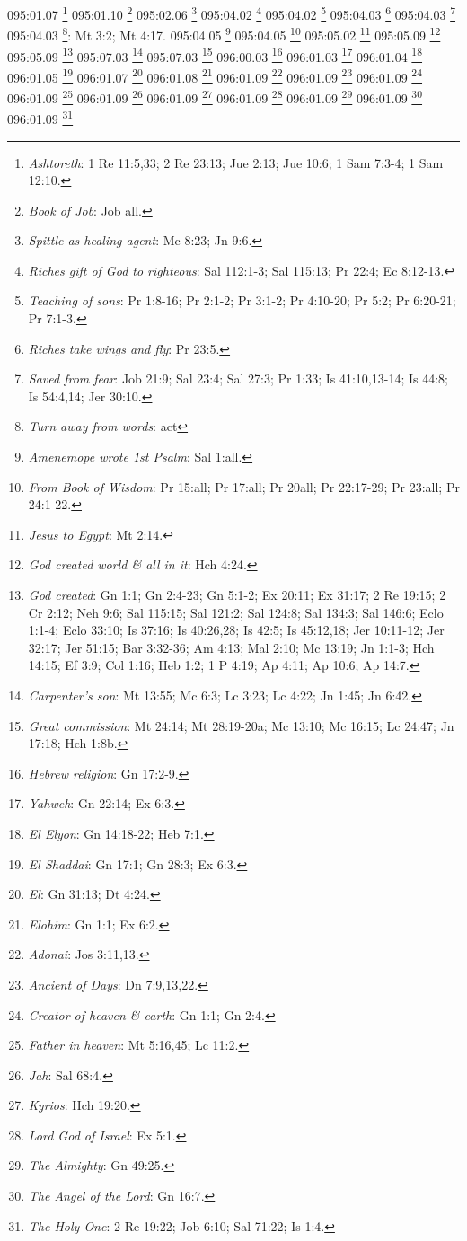 {{{{{{{{{{{{{{{{095:01.07 \footnote{\textit{Ashtoreth}: 1 Re 11:5,33; 2 Re 23:13; Jue 2:13; Jue 10:6; 1 Sam 7:3-4; 1 Sam 12:10.}
095:01.10 \footnote{\textit{Book of Job}: Job all.}
095:02.06 \footnote{\textit{Spittle as healing agent}: Mc 8:23; Jn 9:6.}
095:04.02 \footnote{\textit{Riches gift of God to righteous}: Sal 112:1-3; Sal 115:13; Pr 22:4; Ec 8:12-13.}
095:04.02 \footnote{\textit{Teaching of sons}: Pr 1:8-16; Pr 2:1-2; Pr 3:1-2; Pr 4:10-20; Pr 5:2; Pr 6:20-21; Pr 7:1-3.}
095:04.03 \footnote{\textit{Riches take wings and fly}: Pr 23:5.}
095:04.03 \footnote{\textit{Saved from fear}: Job 21:9; Sal 23:4; Sal 27:3; Pr 1:33; Is 41:10,13-14; Is 44:8; Is 54:4,14; Jer 30:10.}
095:04.03 \footnote{\textit{Turn away from words}: act}: Mt 3:2; Mt 4:17.}
095:04.05 \footnote{\textit{Amenemope wrote 1st Psalm}: Sal 1:all.}
095:04.05 \footnote{\textit{From Book of Wisdom}: Pr 15:all; Pr 17:all; Pr 20all; Pr 22:17-29; Pr 23:all; Pr 24:1-22.}
095:05.02 \footnote{\textit{Jesus to Egypt}: Mt 2:14.}
095:05.09 \footnote{\textit{God created world & all in it}: Hch 4:24.}
095:05.09 \footnote{\textit{God created}: Gn 1:1; Gn 2:4-23; Gn 5:1-2; Ex 20:11; Ex 31:17; 2 Re 19:15; 2 Cr 2:12; Neh 9:6; Sal 115:15; Sal 121:2; Sal 124:8; Sal 134:3; Sal 146:6; Eclo 1:1-4; Eclo 33:10; Is 37:16; Is 40:26,28; Is 42:5; Is 45:12,18; Jer 10:11-12; Jer 32:17; Jer 51:15; Bar 3:32-36; Am 4:13; Mal 2:10; Mc 13:19; Jn 1:1-3; Hch 14:15; Ef 3:9; Col 1:16; Heb 1:2; 1 P 4:19; Ap 4:11; Ap 10:6; Ap 14:7.}
095:07.03 \footnote{\textit{Carpenter's son}: Mt 13:55; Mc 6:3; Lc 3:23; Lc 4:22; Jn 1:45; Jn 6:42.}
095:07.03 \footnote{\textit{Great commission}: Mt 24:14; Mt 28:19-20a; Mc 13:10; Mc 16:15; Lc 24:47; Jn 17:18; Hch 1:8b.}
096:00.03 \footnote{\textit{Hebrew religion}: Gn 17:2-9.}
096:01.03 \footnote{\textit{Yahweh}: Gn 22:14; Ex 6:3.}
096:01.04 \footnote{\textit{El Elyon}: Gn 14:18-22; Heb 7:1.}
096:01.05 \footnote{\textit{El Shaddai}: Gn 17:1; Gn 28:3; Ex 6:3.}
096:01.07 \footnote{\textit{El}: Gn 31:13; Dt 4:24.}
096:01.08 \footnote{\textit{Elohim}: Gn 1:1; Ex 6:2.}
096:01.09 \footnote{\textit{Adonai}: Jos 3:11,13.}
096:01.09 \footnote{\textit{Ancient of Days}: Dn 7:9,13,22.}
096:01.09 \footnote{\textit{Creator of heaven & earth}: Gn 1:1; Gn 2:4.}
096:01.09 \footnote{\textit{Father in heaven}: Mt 5:16,45; Lc 11:2.}
096:01.09 \footnote{\textit{Jah}: Sal 68:4.}
096:01.09 \footnote{\textit{Kyrios}: Hch 19:20.}
096:01.09 \footnote{\textit{Lord God of Israel}: Ex 5:1.}
096:01.09 \footnote{\textit{The Almighty}: Gn 49:25.}
096:01.09 \footnote{\textit{The Angel of the Lord}: Gn 16:7.}
096:01.09 \footnote{\textit{The Holy One}: 2 Re 19:22; Job 6:10; Sal 71:22; Is 1:4.}
}}}}}}}}}}}}}}}
